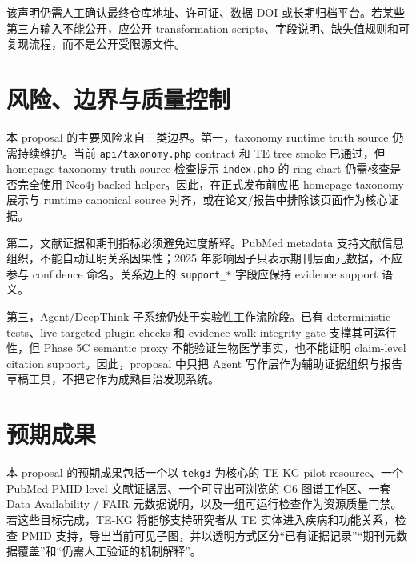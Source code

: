 \documentclass[12pt,a4paper,UTF8]{ctexart}
\begin{document}
该声明仍需人工确认最终仓库地址、许可证、数据 DOI 或长期归档平台。若某些第三方输入不能公开，应公开 transformation scripts、字段说明、缺失值规则和可复现流程，而不是公开受限源文件。

\section{风险、边界与质量控制}

本 proposal 的主要风险来自三类边界。第一，taxonomy runtime truth source 仍需持续维护。当前 \texttt{api/taxonomy.php} contract 和 TE tree smoke 已通过，但 homepage taxonomy truth-source 检查提示 \texttt{index.php} 的 ring chart 仍需核查是否完全使用 Neo4j-backed helper。因此，在正式发布前应把 homepage taxonomy 展示与 runtime canonical source 对齐，或在论文/报告中排除该页面作为核心证据。

第二，文献证据和期刊指标必须避免过度解释。PubMed metadata 支持文献信息组织，不能自动证明关系因果性；2025 年影响因子只表示期刊层面元数据，不应参与 confidence 命名。关系边上的 \texttt{support\_*} 字段应保持 evidence support 语义。

第三，Agent/DeepThink 子系统仍处于实验性工作流阶段。已有 deterministic tests、live targeted plugin checks 和 evidence-walk integrity gate 支撑其可运行性，但 Phase 5C semantic proxy 不能验证生物医学事实，也不能证明 claim-level citation support。因此，proposal 中只把 Agent 写作层作为辅助证据组织与报告草稿工具，不把它作为成熟自治发现系统。

\section{预期成果}

本 proposal 的预期成果包括一个以 \texttt{tekg3} 为核心的 TE-KG pilot resource、一个 PubMed PMID-level 文献证据层、一个可导出可浏览的 G6 图谱工作区、一套 Data Availability / FAIR 元数据说明，以及一组可运行检查作为资源质量门禁。若这些目标完成，TE-KG 将能够支持研究者从 TE 实体进入疾病和功能关系，检查 PMID 支持，导出当前可见子图，并以透明方式区分“已有证据记录”“期刊元数据覆盖”和“仍需人工验证的机制解释”。

\end{document}

